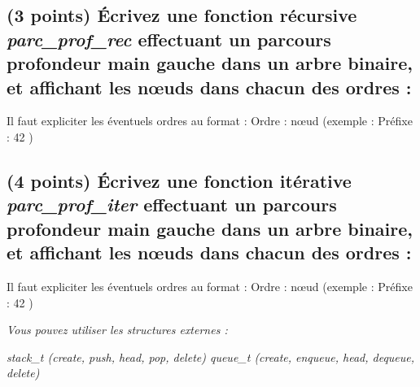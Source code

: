 \documentclass[11pt,a4paper]{article}
\begin{document}

\subsection{(3 points) \'Ecrivez une fonction récursive \og \textit{parc\_prof\_rec} \fg{} effectuant un parcours profondeur main gauche dans un arbre binaire, et affichant les nœuds dans chacun des ordres : }

\noindent Il faut expliciter les éventuels ordres au format : \og Ordre : nœud \fg{} (exemple : \og Préfixe : 42 \fg{})

\begin{center}
\end{center}



\clearpage


\subsection{(4 points) \'Ecrivez une fonction itérative \og \textit{parc\_prof\_iter} \fg{} effectuant un parcours profondeur main gauche dans un arbre binaire, et affichant les nœuds dans chacun des ordres : }

\noindent Il faut expliciter les éventuels ordres au format : \og Ordre : nœud \fg{} (exemple : \og Préfixe : 42 \fg{})

\medskip

\noindent \textit{Vous pouvez utiliser les structures externes :}

\noindent \textit{stack\_t (create, push, head, pop, delete) \hfill queue\_t (create, enqueue, head, dequeue, delete) }

\begin{center}
\end{center}


\clearpage



\end{document}
